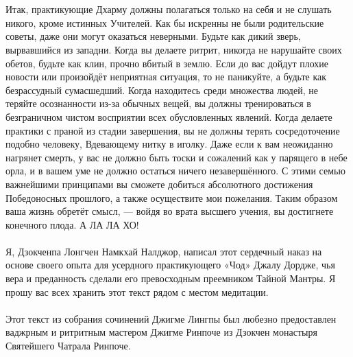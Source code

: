 \\ \\ Итак, практикующие Дхарму должны полагаться только на себя и не слушать никого, кроме истинных Учителей. Как бы искренны не были родительские советы, даже они могут оказаться неверными. Будьте как дикий зверь, вырвавшийся из западни. Когда вы делаете ритрит, никогда не нарушайте своих обетов, будьте как клин, прочно вбитый в землю. Если до вас дойдут плохие новости или произойдёт неприятная ситуация, то не паникуйте, а будьте как безрассудный сумасшедший. Когда находитесь среди множества людей, не теряйте осознанности из-за обычных вещей, вы должны тренироваться в безграничном чистом восприятии всех обусловленных явлений. Когда делаете практики с праной из стадии завершения, вы не должны терять сосредоточение подобно человеку, Вдевающему нитку в иголку. Даже если к вам неожиданно нагрянет смерть, у вас не должно быть тоски и сожалений как у парящего в небе орла, и в вашем уме не должно остаться ничего незавершённого. С этими семью важнейшими принципами вы сможете добиться абсолютного достижения Победоносных прошлого, а также осуществите мои пожелания. Таким образом ваша жизнь обретёт смысл, — войдя во врата высшего учения, вы достигнете конечного плода. А ЛА ЛА ХО!
\\ \\ 
\scriptsize
Я, Дзокченпа Лонгчен Намкхай Налджор, написал этот сердечный наказ на основе своего опыта для усердного практикующего «Чод» Джалу Дордже, чья вера и преданность сделали его превосходным преемником Тайной Мантры. Я прошу вас всех хранить этот текст рядом с местом медитации.
\\ \\ Этот текст из собрания сочинений Джигме Лингпы был любезно предоставлен
ваджрным и ритритным мастером Джигме Ринпоче из Дзокчен монастыря
Святейшего Чатрала Ринпоче.
\normalsize
